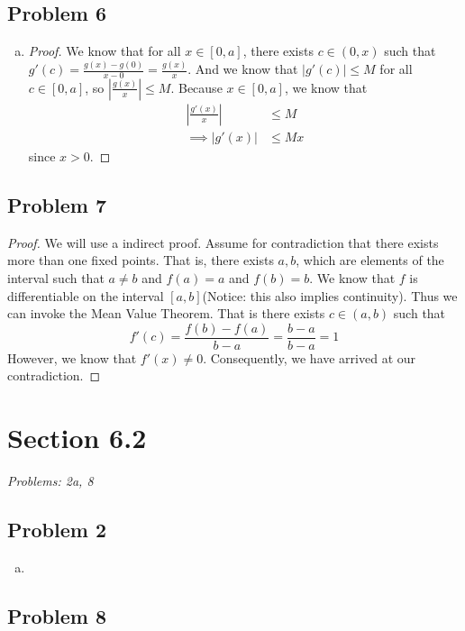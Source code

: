 \documentclass[12pt]{article}
\begin{document}
\subsection*{Problem 6}
\begin{enumerate}[a).]
    \item {
        \begin{proof}
            We know that for all $x \in [0,a]$, there exists $c \in (0,x)$ such that $g'(c) = \frac{g(x) - g(0)}{x-0} = \frac{g(x)}{x}$.
            And we know that $|g'(c)| \le M$ for all $c \in [0,a]$, so $|\frac{g(x)}{x}| \le M$.
            Because $x \in [0,a]$, we know that 
            \begin{align*}
                \left| \frac{g'(x)}{x} \right| &\le M \\
                \implies \left| g'(x)\right| &\le Mx
            \end{align*}
            since $x> 0$.
        \end{proof}
    }
\end{enumerate}

\subsection*{Problem 7}
\begin{proof}
    We will use a indirect proof. 
    Assume for contradiction that there exists more than one fixed points. 
    That is, there exists $a, b$, which are elements of the interval such that $a \ne b$ and $f(a) = a$ and $f(b) = b$. 
    We know that $f$ is differentiable on the interval $[a,b]$(Notice: this also implies continuity).
    Thus we can invoke the Mean Value Theorem.
    That is there exists $c \in (a,b)$ such that 
    $$f'(c) = \frac{f(b) - f(a)}{b - a} = \frac{b - a}{ b - a} = 1$$
    However, we know that $f'(x) \ne 0$.
    Consequently, we have arrived at our contradiction.
    
\end{proof}


\vspace*{1cm}


\section*{Section 6.2}
\textit{Problems: 2a, 8}
\subsection*{Problem 2}
\begin{enumerate}[a).]
    \item {
    }
\end{enumerate}


\subsection*{Problem 8}
\end{document}
